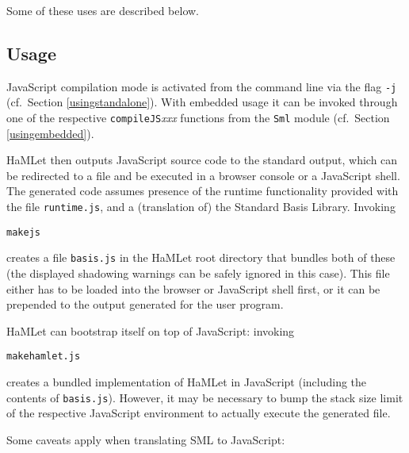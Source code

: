\documentclass[twoside,titlepage]{article}
\begin{document}
Some of these uses are described below.


\subsection{Usage}
\label{javascriptusage}

JavaScript compilation mode is activated from the command line via the flag {\tt -j} (cf.\ Section \ref{usingstandalone}). With embedded usage it can be invoked through one of the respective {\tt compileJS}{\it xxx} functions from the {\tt Sml} module (cf.\ Section \ref{usingembedded}).

HaMLet then outputs JavaScript source code to the standard output, which can be redirected to a file and be executed in a browser console or a JavaScript shell. The generated code assumes presence of the runtime functionality provided with the file {\tt runtime.js}, and a (translation of) the Standard Basis Library. Invoking
%
\begin{quoting}
\begin{alltt}
make js
\end{alltt}
\end{quoting}
%
creates a file {\tt basis.js} in the HaMLet root directory that bundles both of these (the displayed shadowing warnings can be safely ignored in this case). This file either has to be loaded into the browser or JavaScript shell first, or it can be prepended to the output generated for the user program.

HaMLet can bootstrap itself on top of JavaScript: invoking
%
\begin{quoting}
\begin{alltt}
make hamlet.js
\end{alltt}
\end{quoting}
%
creates a bundled implementation of HaMLet in JavaScript (including the contents of {\tt basis.js}). However, it may be necessary to bump the stack size limit of the respective JavaScript environment to actually execute the generated file.

Some caveats apply when translating SML to JavaScript:
\end{document}
